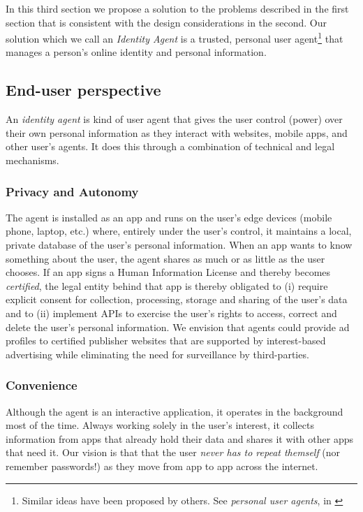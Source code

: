 \documentclass[11pt, oneside]{article}   	%
\begin{document}
In this third section we propose a solution to the problems described in the first section that is consistent with the design considerations in the second. Our solution which we call an \emph{Identity Agent} is a trusted, personal user agent\footnote{Similar ideas have been proposed by others. See \emph{personal user agents}, in \cite[p24]{Flanagan2020}} that manages a person's online identity and personal information. 

\subsection{End-user perspective}
An \emph{identity agent} is kind of user agent that gives the user control (power) over their own personal information as they interact with websites, mobile apps, and other user's agents. It does this through a combination of technical and legal mechanisms.

\subsubsection{Privacy and Autonomy} 
The agent is installed as an app and runs on the user's edge devices (mobile phone, laptop, etc.) where, entirely under the user's control, it maintains a local, private database of the user's personal information. When an app wants to know something about the user, the agent shares as much or as little as the user chooses. If an app signs a Human Information License and thereby becomes \emph{certified}, the legal entity behind that app is thereby obligated to (i) require explicit consent for collection, processing, storage and sharing of the user's data and to (ii) implement APIs to exercise the user's rights to access, correct and delete the user's personal information. We envision that agents could provide ad profiles to certified publisher websites that are supported by interest-based advertising while eliminating the need for surveillance by third-parties.

\subsubsection{Convenience}
Although the agent is an interactive application, it operates in the background most of the time. Always working solely in the user's interest, it collects information from apps that already hold their data and shares it with other apps that need it. Our vision is that that the user \emph{never has to repeat themself} (nor remember passwords!) as they move from app to app across the internet.
\end{document}
